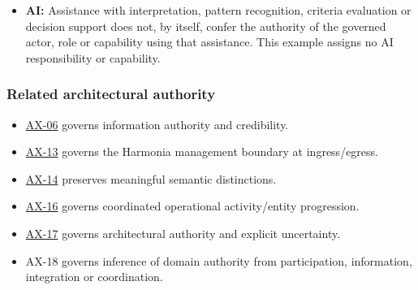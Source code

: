 \begin{itemize}
\item
\textbf{AI:} Assistance with interpretation, pattern recognition, criteria evaluation or decision support does not, by itself, confer the authority of the governed actor, role or capability using that assistance. This example assigns no AI responsibility or capability.



\end{itemize}
\label{rad:axioms:959}
\subsubsection*{Related architectural authority}
\label{rad:axioms:961}

\begin{itemize}

\item
\href{https://github.com/fhirfactory/harmonia/blob/98410db60155198a75f74c79d98060070209faa1/docs/markdown/governance/architectural-axioms.md\#ax-06}{AX-06} governs information authority and credibility.



\item
\href{https://github.com/fhirfactory/harmonia/blob/98410db60155198a75f74c79d98060070209faa1/docs/markdown/governance/architectural-axioms.md\#ax-13}{AX-13} governs the Harmonia management boundary at ingress/\allowbreak{}egress.



\item
\href{https://github.com/fhirfactory/harmonia/blob/98410db60155198a75f74c79d98060070209faa1/docs/markdown/governance/architectural-axioms.md\#ax-14}{AX-14} preserves meaningful semantic distinctions.



\item
\href{https://github.com/fhirfactory/harmonia/blob/98410db60155198a75f74c79d98060070209faa1/docs/markdown/governance/architectural-axioms.md\#ax-16}{AX-16} governs coordinated operational activity/\allowbreak{}entity progression.



\item
\href{https://github.com/fhirfactory/harmonia/blob/98410db60155198a75f74c79d98060070209faa1/docs/markdown/governance/architectural-axioms.md\#ax-17}{AX-17} governs architectural authority and explicit uncertainty.



\item
AX-18 governs inference of domain authority from participation, information, integration or coordination.



\end{itemize}
